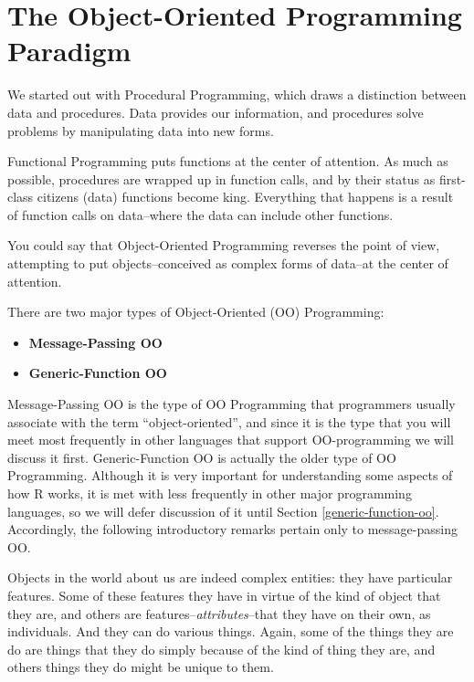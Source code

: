 \documentclass[]{book}
\providecommand{\tightlist}{%
  \setlength{\itemsep}{0pt}\setlength{\parskip}{0pt}}
\theoremstyle{definition}
\theoremstyle{definition}
\theoremstyle{remark}
\begin{document}
{\newpage

\section{The Object-Oriented Programming
Paradigm}\label{the-object-oriented-programming-paradigm}

We started out with Procedural Programming, which draws a distinction
between data and procedures. Data provides our information, and
procedures solve problems by manipulating data into new forms.

Functional Programming puts functions at the center of attention.
 As much as possible, procedures are
wrapped up in function calls, and by their status as first-class
citizens (data) functions become king. Everything that happens is a
result of function calls on data--where the data can include other
functions.

You could say that Object-Oriented Programming
 reverses the point of view,
attempting to put objects--conceived as complex forms of data--at the
center of attention.

There are two major types of Object-Oriented (OO) Programming:

\begin{itemize}
\tightlist
\item
  \textbf{Message-Passing OO}
\item
  \textbf{Generic-Function OO}
\end{itemize}

Message-Passing OO is the type of OO
Programming that programmers usually associate with the term
``object-oriented'', and since it is the type that you will meet most
frequently in other languages that support OO-programming we will
discuss it first. Generic-Function OO is actually the older type of OO
Programming. Although it is very important for understanding some
aspects of how R works, it is met with less frequently in other major
programming languages, so we will defer discussion of it until Section
\ref{generic-function-oo}. Accordingly, the following introductory
remarks pertain only to message-passing OO.

Objects in the world about us are indeed complex entities: they have
particular features. Some of these features they have in virtue of the
kind of object that they are, and others are
features--\emph{attributes}--that they have on their own, as
individuals. And they can do various things. Again, some of the things
they are do are things that they do simply because of the kind of thing
they are, and others things they do might be unique to them.

}
\end{document}
